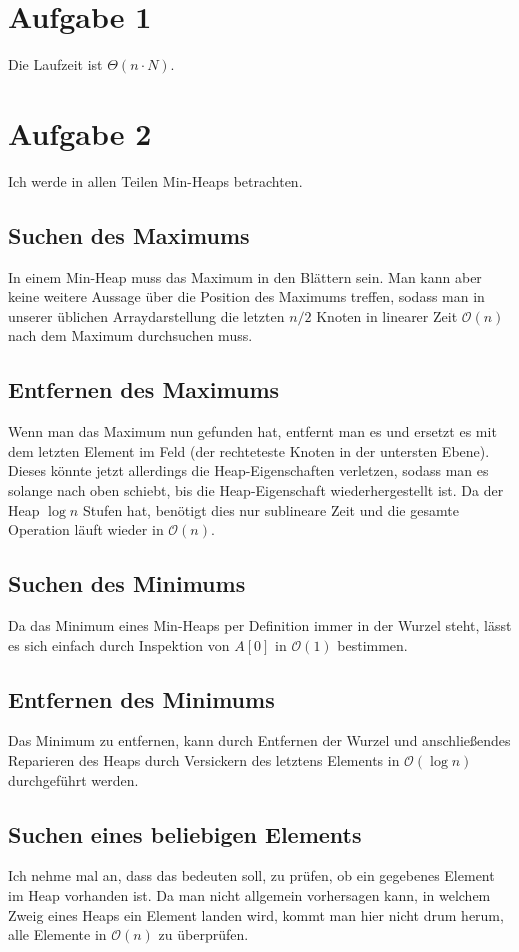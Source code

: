 \documentclass[10pt,a4paper]{article}
\begin{document}
\section{Aufgabe 1}
Die Laufzeit ist $\Theta(n \cdot N)$.

\section{Aufgabe 2}
Ich werde in allen Teilen Min-Heaps betrachten.

\subsection{Suchen des Maximums}
In einem Min-Heap muss das Maximum in den Blättern sein.
Man kann aber keine weitere Aussage über die Position des Maximums treffen, sodass man in unserer üblichen Arraydarstellung die letzten $n / 2$ Knoten in linearer Zeit $\mathcal{O}(n)$ nach dem Maximum durchsuchen muss.

\subsection{Entfernen des Maximums}
Wenn man das Maximum nun gefunden hat, entfernt man es und ersetzt es mit dem letzten Element im Feld (der rechteteste Knoten in der untersten Ebene).
Dieses könnte jetzt allerdings die Heap-Eigenschaften verletzen, sodass man es solange nach oben schiebt, bis die Heap-Eigenschaft wiederhergestellt ist.
Da der Heap $\log n$ Stufen hat, benötigt dies nur sublineare Zeit und die gesamte Operation läuft wieder in $\mathcal{O}(n)$.

\subsection{Suchen des Minimums}
Da das Minimum eines Min-Heaps per Definition immer in der Wurzel steht, lässt es sich einfach durch Inspektion von $A[0]$ in $\mathcal{O}(1)$ bestimmen.

\subsection{Entfernen des Minimums}
Das Minimum zu entfernen, kann durch Entfernen der Wurzel und anschließendes Reparieren des Heaps durch Versickern des letztens Elements in $\mathcal{O}(\log n)$ durchgeführt werden.

\subsection{Suchen eines beliebigen Elements}
Ich nehme mal an, dass das bedeuten soll, zu prüfen, ob ein gegebenes Element im Heap vorhanden ist.
Da man nicht allgemein vorhersagen kann, in welchem Zweig eines Heaps ein Element landen wird, kommt man hier nicht drum herum, alle Elemente in $\mathcal{O}(n)$ zu überprüfen.
\end{document}
